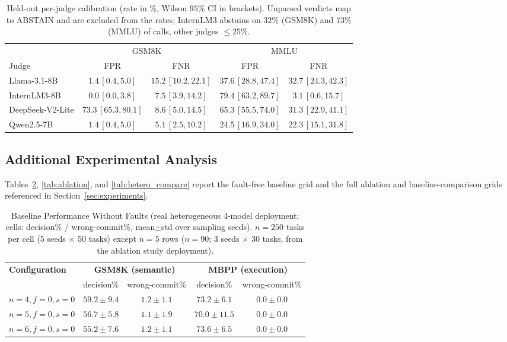 \documentclass{article}
\begin{document}
\begin{table}[htbp]
\centering\small
\caption{Held-out per-judge calibration (rate in \%, Wilson $95\%$ CI in brackets). Unparsed verdicts map to ABSTAIN and are excluded from the rates; InternLM3 abstains on $32\%$ (GSM8K) and $73\%$ (MMLU) of calls, other judges $\leq 25\%$.}
\label{tab:judge_heldout}
\begin{tabular}{lcccc}
\toprule
 & \multicolumn{2}{c}{GSM8K} & \multicolumn{2}{c}{MMLU} \\
\cmidrule(lr){2-3}\cmidrule(lr){4-5}
Judge & FPR & FNR & FPR & FNR \\
\midrule
Llama-3.1-8B & $1.4\,[0.4, 5.0]$ & $15.2\,[10.2, 22.1]$ & $37.6\,[28.8, 47.4]$ & $32.7\,[24.3, 42.3]$ \\
InternLM3-8B & $0.0\,[0.0, 3.8]$ & $7.5\,[3.9, 14.2]$ & $79.4\,[63.2, 89.7]$ & $3.1\,[0.6, 15.7]$ \\
DeepSeek-V2-Lite & $\mathbf{73.3}\,[65.3, 80.1]$ & $8.6\,[5.0, 14.5]$ & $\mathbf{65.3}\,[55.5, 74.0]$ & $31.3\,[22.9, 41.1]$ \\
Qwen2.5-7B & $1.4\,[0.4, 5.0]$ & $5.1\,[2.5, 10.2]$ & $24.5\,[16.9, 34.0]$ & $22.3\,[15.1, 31.8]$ \\
\bottomrule
\end{tabular}
\end{table}

\subsection{Additional Experimental Analysis}\label{app:additional}

Tables~\ref{tab:baseline}, \ref{tab:ablation}, and \ref{tab:hetero_compare} report the fault-free baseline grid and the full ablation and baseline-comparison grids referenced in Section~\ref{sec:experiments}.

\begin{table}[htbp]
\centering\small
\caption{Baseline Performance Without Faults (real heterogeneous 4-model deployment; cells: decision\% / wrong-commit\%, mean$\pm$std over sampling seeds). $n{=}250$ tasks per cell (5 seeds $\times$ 50 tasks) except $n{=}5$ rows ($n{=}90$; 3 seeds $\times$ 30 tasks, from the ablation study deployment).}
\label{tab:baseline}
\begin{tabular}{lcccc}
\toprule
\textbf{Configuration} & \multicolumn{2}{c}{\textbf{GSM8K (semantic)}} & \multicolumn{2}{c}{\textbf{MBPP (execution)}} \\
\cmidrule(lr){2-3} \cmidrule(lr){4-5}
 & decision\% & wrong-commit\% & decision\% & wrong-commit\% \\
\midrule
$n=4, f=0, s=0$ & $59.2 \pm 9.4$ & $1.2 \pm 1.1$ & $73.2 \pm 6.1$ & $\mathbf{0.0 \pm 0.0}$ \\
$n=5, f=0, s=0$ & $56.7 \pm 5.8$ & $1.1 \pm 1.9$ & $70.0 \pm 11.5$ & $\mathbf{0.0 \pm 0.0}$ \\
$n=6, f=0, s=0$ & $55.2 \pm 7.6$ & $1.2 \pm 1.1$ & $73.6 \pm 6.5$ & $\mathbf{0.0 \pm 0.0}$ \\
\bottomrule
\end{tabular}
\end{table}
\end{document}
